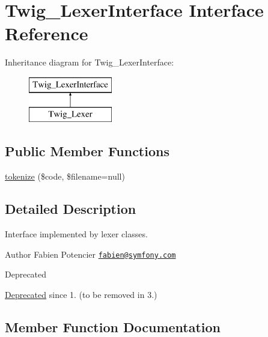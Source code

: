 \hypertarget{interface_twig___lexer_interface}{}\section{Twig\+\_\+\+Lexer\+Interface Interface Reference}
\label{interface_twig___lexer_interface}
Inheritance diagram for Twig\+\_\+\+Lexer\+Interface\+:\begin{figure}[H]
\begin{center}
\leavevmode
\includegraphics[height=2.000000cm]{interface_twig___lexer_interface}
\end{center}
\end{figure}
\subsection*{Public Member Functions}
\begin{DoxyCompactItemize}
\item 
\hyperlink{interface_twig___lexer_interface_a8db0ea9f7a98bc3fd2ba77126ab20491}{tokenize} (\$code, \$filename=null)
\end{DoxyCompactItemize}


\subsection{Detailed Description}
Interface implemented by lexer classes.

\begin{DoxyAuthor}{Author}
Fabien Potencier \href{mailto:fabien@symfony.com}{\tt fabien@symfony.\+com}
\end{DoxyAuthor}
\begin{DoxyRefDesc}{Deprecated}
\item[\hyperlink{deprecated__deprecated000016}{Deprecated}]since 1. (to be removed in 3.) \end{DoxyRefDesc}


\subsection{Member Function Documentation}
\hypertarget{interface_twig___lexer_interface_a8db0ea9f7a98bc3fd2ba77126ab20491}{}
